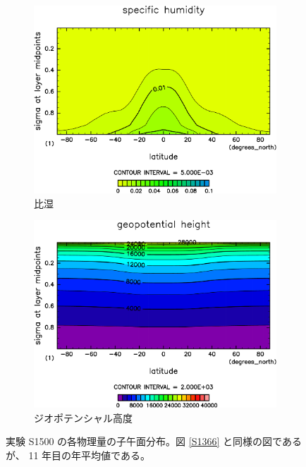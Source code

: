 \documentclass[body]{subfiles}
\begin{document}
\begin{figure}[t]
\begin{subfigure}{.4\textwidth}
		\includegraphics[width=\textwidth]{S1500/QH2OVap,time=3650:4015-crop-rotate.pdf}
		\caption{比湿\hmu*{[kg/kg]}}\label{S1500比湿}
	\end{subfigure}
	\begin{subfigure}{.4\textwidth}
		\centering
		\includegraphics[width=\textwidth]{S1500/Height,time=3650:4015-crop-rotate.pdf}
		\caption{ジオポテンシャル高度\hmu*{[m]}}\label{S1500ジオポテンシャル高度}
	\end{subfigure}
	\caption[実験 S1500 の各物理量の子午面分布]{
		実験 S1500 の各物理量の子午面分布。図 \ref{S1366} と同様の図であるが、
		11 年目の年平均値である。
	}\label{S1500}
\end{figure}
\end{document}
